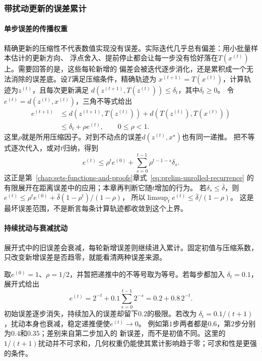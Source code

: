 \subsubsection{带扰动更新的误差累计}

\paragraph{单步误差的传播权重}

精确更新的压缩性不代表数值实现没有误差。实际迭代几乎总有偏差：用小批量样本估计的更新方向、
浮点舍入、提前停止都会让每一步没有恰好落在$T(x^{(t)})$上。需要回答的是，这些每轮新增的
偏差会被迭代逐步消化，还是累积成一个无法消除的误差底。设$T$满足压缩条件，精确轨迹为
$x^{(t+1)}=T(x^{(t)})$，计算轨迹为$z^{(t)}$，且每次更新满足
$d(z^{(t+1)},T(z^{(t)}))\leq\delta_t$，其中$\delta_t\geq0$。
令$e^{(t)}=d(z^{(t)},x^{(t)})$，三角不等式给出
\begin{equation}
 \begin{aligned}
 e^{(t+1)}
 &\leq d(z^{(t+1)},T(z^{(t)}))
       +d(T(z^{(t)}),T(x^{(t)}))\\
 &\leq\delta_t+\rho e^{(t)},\qquad 0\leq\rho<1.
 \end{aligned}
\label{eq:analysis-perturbed-distance-recursion}
\end{equation}
这里$\rho$就是所用压缩因子。对到不动点的误差$d(z^{(t)},x^\star)$也有同一递推。
把不等式逐次代入，或对$t$归纳，得到
\begin{equation}
 e^{(t)}
 \leq \rho^t e^{(0)}
       +\sum_{s=0}^{t-1}\rho^{t-1-s}\delta_s.
\label{eq:analysis-perturbed-distance-unrolling}
\end{equation}
这正是第~\ref{chap:sets-functions-and-proofs}章式~\eqref{eq:prelim-unrolled-recurrence}
的有限展开在距离误差中的应用；本章再判断它随$t$增加的行为。
若$\delta_s\leq\bar\delta$，则
$e^{(t)}\leq\rho^t e^{(0)}+\bar\delta(1-\rho^t)/(1-\rho)$，
所以$\limsup_t e^{(t)}\leq\bar\delta/(1-\rho)$。
这是最坏误差范围，不是断言每条计算轨迹都收敛到这个上界。

\paragraph{持续扰动与衰减扰动}

展开式中的旧误差会衰减，每轮新增误差则继续进入累计。固定初值与压缩系数，只改变新增误差是否趋零，就能看清两种误差来源。
\begin{example}[持续扰动与衰减扰动]
\label{ex:prelim-recurring-perturbations}
取$e^{(0)}=1$、$\rho=1/2$，并暂把递推中的不等号取为等号。若每步都加入
$\delta_t=0.1$，展开式给出
\[
 e^{(t)}=2^{-t}+0.1\sum_{s=0}^{t-1}2^{-s}
        =0.2+0.8\,2^{-t}.
\]
初始误差逐步消失，持续加入的误差却留下$0.2$的极限。若改为
$\delta_t=0.1/(t+1)$，扰动本身也衰减，稳定递推便使$e^{(t)}\to0$。
例如第$1$步两者都是$0.6$，第$2$步分别为$0.4$和$0.35$；差别来自第二步加入的
新误差，而不是初值不同。这里的$1/(t+1)$扰动并不可求和，几何权重仍能使其累计影响趋于零；可求和性是更强的条件。
\end{example}


